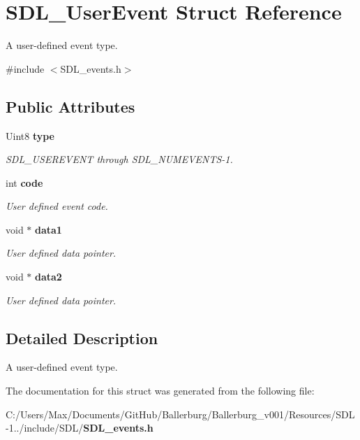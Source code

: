 \section{S\+D\+L\+\_\+\+User\+Event Struct Reference}
\label{struct_s_d_l___user_event}


A user-\/defined event type.  




{\ttfamily \#include $<$S\+D\+L\+\_\+events.\+h$>$}

\subsection*{Public Attributes}
\begin{DoxyCompactItemize}
\item 
Uint8 {\bf type}\label{struct_s_d_l___user_event_a4ad7c1f518eef5dfedc09c9bab1d1e42}

\begin{DoxyCompactList}\small\item\em S\+D\+L\+\_\+\+U\+S\+E\+R\+E\+V\+E\+N\+T through S\+D\+L\+\_\+\+N\+U\+M\+E\+V\+E\+N\+T\+S-\/1. \end{DoxyCompactList}\item 
int {\bf code}\label{struct_s_d_l___user_event_aed0990a34143309d42e9d0f20a7a9cd4}

\begin{DoxyCompactList}\small\item\em User defined event code. \end{DoxyCompactList}\item 
void $\ast$ {\bf data1}\label{struct_s_d_l___user_event_ab2893a12be2f97195f16463a23107913}

\begin{DoxyCompactList}\small\item\em User defined data pointer. \end{DoxyCompactList}\item 
void $\ast$ {\bf data2}\label{struct_s_d_l___user_event_aae4dbf65c34d654c9edf519eb061b7cf}

\begin{DoxyCompactList}\small\item\em User defined data pointer. \end{DoxyCompactList}\end{DoxyCompactItemize}


\subsection{Detailed Description}
A user-\/defined event type. 

The documentation for this struct was generated from the following file\+:\begin{DoxyCompactItemize}
\item 
C\+:/\+Users/\+Max/\+Documents/\+Git\+Hub/\+Ballerburg/\+Ballerburg\+\_\+v001/\+Resources/\+S\+D\+L-\/1../include/\+S\+D\+L/{\bf S\+D\+L\+\_\+events.\+h}\end{DoxyCompactItemize}
